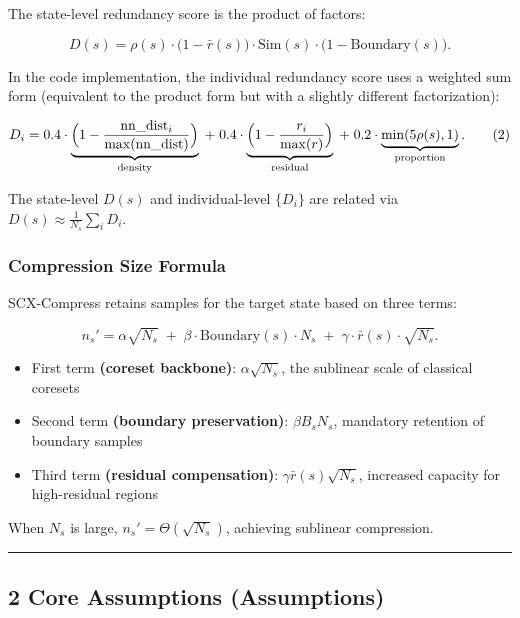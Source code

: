 \documentclass[
  12pt,
]{article}
\providecommand{\tightlist}{%
  \setlength{\itemsep}{0pt}\setlength{\parskip}{0pt}}
\begin{document}
The state-level redundancy score is the product of factors:

\[
D(s) = \rho(s) \cdot \bigl(1 - \bar{r}(s)\bigr) \cdot \text{Sim}(s) \cdot \bigl(1 - \text{Boundary}(s)\bigr).
\tag{1}
\]

In the code implementation, the individual redundancy score uses a weighted sum form (equivalent to the product form but with a slightly different factorization):

\[
D_i = 0.4 \cdot \underbrace{\Bigl(1 - \frac{\text{nn\_dist}_i}{\max(\text{nn\_dist})}\Bigr)}_{\text{density}} \;+\; 0.4 \cdot \underbrace{\Bigl(1 - \frac{r_i}{\max(r)}\Bigr)}_{\text{residual}} \;+\; 0.2 \cdot \underbrace{\min(5\rho(s), 1)}_{\text{proportion}}.
\tag{2}
\]

The state-level \(D(s)\) and individual-level \(\{D_i\}\) are related via
\(D(s) \approx \frac{1}{N_s} \sum_i D_i\).

\subsubsection{Compression Size Formula}\label{compression-size-formula}

SCX-Compress retains samples for the target state based on three terms:

\[
n_s' = \alpha \sqrt{N_s} \;+\; \beta \cdot \text{Boundary}(s) \cdot N_s \;+\; \gamma \cdot \bar{r}(s) \cdot \sqrt{N_s}.
\tag{3}
\]

\begin{itemize}
\tightlist
\item
  First term \textbf{(coreset backbone)}: \(\alpha \sqrt{N_s}\), the sublinear scale of classical coresets
\item
  Second term \textbf{(boundary preservation)}: \(\beta B_s N_s\), mandatory retention of boundary samples
\item
  Third term \textbf{(residual compensation)}: \(\gamma \bar{r}(s) \sqrt{N_s}\), increased capacity for high-residual regions
\end{itemize}

When \(N_s\) is large, \(n_s' = \Theta(\sqrt{N_s})\), achieving sublinear compression.

\begin{center}\rule{0.5\linewidth}{0.5pt}\end{center}

\subsection{2 Core Assumptions (Assumptions)}\label{core-assumptions}
\end{document}
